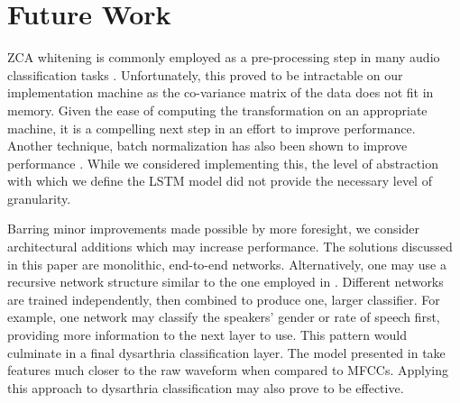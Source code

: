 \section{Future Work}
ZCA whitening is commonly employed as a pre-processing step in many audio classification tasks \cite{zca-1} \cite{zca-2} \cite{zca-3}. Unfortunately, this proved to be intractable on our implementation machine as the co-variance matrix of the data does not fit in memory. Given the ease of computing the transformation on an appropriate machine, it is a compelling next step in an effort to improve performance. Another technique, batch normalization has also been shown to improve performance \cite{DBLP:journals/corr/CooijmansBLC16}. While we considered implementing this, the level of abstraction with which we define the LSTM model did not provide the necessary level of granularity.

Barring minor improvements made possible by more foresight, we consider architectural additions which may increase performance. The solutions discussed in this paper are monolithic, end-to-end networks. Alternatively, one may use a recursive network structure similar to the one employed in \cite{carmichael2008combining}. Different networks are trained independently, then combined to produce one, larger classifier. For example, one network may classify the speakers' gender or rate of speech first, providing more information to the next layer to use. This pattern would culminate in a final dysarthria classification layer. The model presented in \cite{DBLP:journals/corr/LeePKN17} take features much closer to the raw waveform when compared to MFCCs. Applying this approach to dysarthria classification may also prove to be effective. 